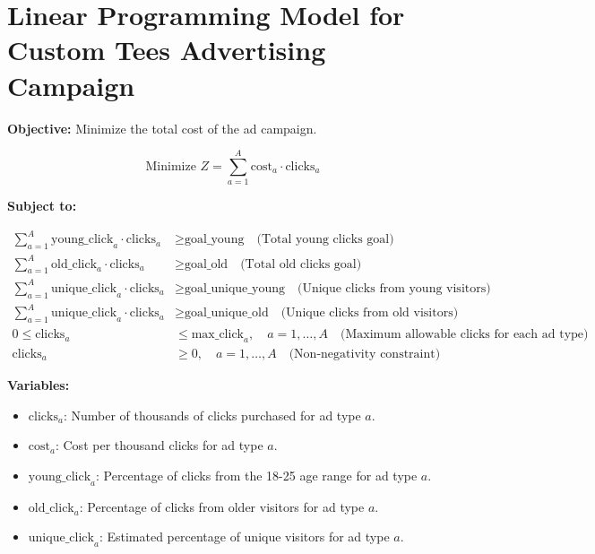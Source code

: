 \documentclass{article}
\begin{document}
\section*{Linear Programming Model for Custom Tees Advertising Campaign}

\textbf{Objective:} Minimize the total cost of the ad campaign.

\[
\text{Minimize } Z = \sum_{a=1}^{A} \text{cost}_a \cdot \text{clicks}_a
\]

\textbf{Subject to:}

\begin{align*}
\sum_{a=1}^{A} \text{young\_click}_{a} \cdot \text{clicks}_{a} &\geq \text{goal\_young} \quad \text{(Total young clicks goal)} \\
\sum_{a=1}^{A} \text{old\_click}_{a} \cdot \text{clicks}_{a} &\geq \text{goal\_old} \quad \text{(Total old clicks goal)} \\
\sum_{a=1}^{A} \text{unique\_click}_{a} \cdot \text{clicks}_{a} &\geq \text{goal\_unique\_young} \quad \text{(Unique clicks from young visitors)} \\
\sum_{a=1}^{A} \text{unique\_click}_{a} \cdot \text{clicks}_{a} &\geq \text{goal\_unique\_old} \quad \text{(Unique clicks from old visitors)} \\
0 \leq \text{clicks}_a &\leq \text{max\_click}_{a}, \quad a = 1, \ldots, A \quad \text{(Maximum allowable clicks for each ad type)} \\
\text{clicks}_a &\geq 0, \quad a = 1, \ldots, A \quad \text{(Non-negativity constraint)}
\end{align*}

\textbf{Variables:}

\begin{itemize}
    \item \( \text{clicks}_{a} \): Number of thousands of clicks purchased for ad type \( a \).
    \item \( \text{cost}_{a} \): Cost per thousand clicks for ad type \( a \).
    \item \( \text{young\_click}_{a} \): Percentage of clicks from the 18-25 age range for ad type \( a \).
    \item \( \text{old\_click}_{a} \): Percentage of clicks from older visitors for ad type \( a \).
    \item \( \text{unique\_click}_{a} \): Estimated percentage of unique visitors for ad type \( a \).
\end{itemize}
\end{document}
